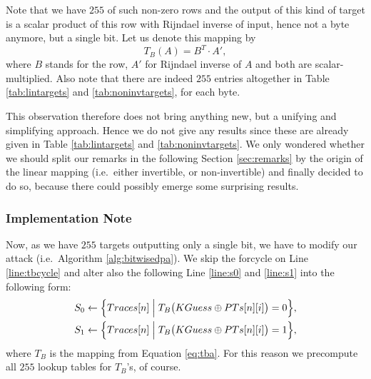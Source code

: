 Note that we have $255$ of such non-zero rows and the output of this kind of target is a scalar product of this row with Rijndael inverse of input, hence not a byte anymore, but a single bit. Let us denote this mapping by
\begin{equation}
\label{eq:tba}
	T_B(A) = B^T\cdot A' ,
\end{equation}
where $B$ stands for the row, $A'$ for Rijndael inverse of $A$ and both are scalar-multiplied. Also note that there are indeed $255$ entries altogether in Table \ref{tab:lintargets} and \ref{tab:noninvtargets}, for each byte.

This observation therefore does not bring anything new, but a unifying and simplifying approach. Hence we do not give any results since these are already given in Table \ref{tab:lintargets} and \ref{tab:noninvtargets}. We only wondered whether we should split our remarks in the following Section \ref{sec:remarks} by the origin of the linear mapping (i.e.\ either invertible, or non-invertible) and finally decided to do so, because there could possibly emerge some surprising results.

\subsubsection{Implementation Note}
	
	Now, as we have $255$ targets outputting only a single bit, we have to modify our attack (i.e.\ Algorithm \ref{alg:bitwisedpa}). We skip the forcycle on Line \ref{line:tbcycle} and alter also the following Line \ref{line:s0} and \ref{line:s1} into the following form:
	\begin{align*}
		S_0 &\gets \Bigl\{ Traces[n] \Bigm| T_B\bigl(KGuess\oplus PTs[n][i]\bigr) = 0 \Bigr\} , \\
		S_1 &\gets \Bigl\{ Traces[n] \Bigm| T_B\bigl(KGuess\oplus PTs[n][i]\bigr) = 1 \Bigr\} ,
	\end{align*}
	where $T_B$ is the mapping from Equation \ref{eq:tba}. For this reason we precompute all $255$ lookup tables for $T_B$'s, of course.
	



